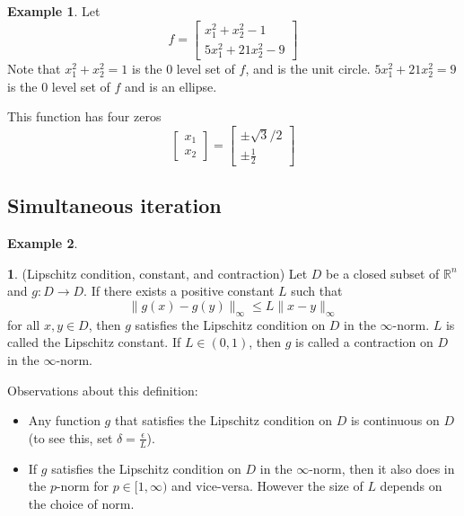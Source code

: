 \documentclass[12pt]{article}
\theoremstyle{definition}
\newtheorem{definition}{\color{NavyBlue}{\textbf{Definition}}}
\newcommand{\e}{\epsilon}
\newcommand{\R}{\mathbb{R}}
\newcommand{\norm}[1]{\lVert#1\rVert}
\newtheorem{example}{\color{WildStrawberry}Example}
\theoremstyle{definition}
\begin{document}
\begin{example}
Let 
\begin{equation}
	f = 
	\begin{bmatrix}
	x_1^2 + x_2^2 - 1 \\
	5x_1^2 + 21x_2^2 - 9
	\end{bmatrix}
\end{equation}
Note that $x_1^2 + x_2^2 = 1$ is the $0$ level set of $f$, and is the unit circle. $5x_1^2 + 21x_2^2 = 9$ is the $0$ level set of $f$ and is an ellipse. 

This function has four zeros
\begin{equation}
	\begin{bmatrix}
	x_1 \\ x_2
	\end{bmatrix}
	=
	\begin{bmatrix}
	\pm \sqrt{3}/2 \\
	\pm \frac{1}{2}
	\end{bmatrix}
\end{equation}
\end{example}

\subsection{Simultaneous iteration}

\begin{example}

\end{example}


\begin{definition}(Lipschitz condition, constant, and contraction)
Let $D$ be a closed subset of $\R^n$ and $g: D \to D$. If there exists a positive constant $L$ such that
\begin{equation}
	\norm{g(x) - g(y)}_\infty \leq L \norm{x - y}_\infty
\end{equation}
for all $x, y \in D$, then $g$ satisfies the Lipschitz condition on $D$ in the $\infty$-norm. $L$ is called the Lipschitz constant. If $L \in (0,1)$, then $g$ is called a contraction on $D$ in the $\infty$-norm. 
\end{definition}

Observations about this definition:
\begin{itemize}
	\item Any function $g$ that satisfies the Lipschitz condition on $D$ is continuous on $D$ (to see this, set $\delta = \frac{\e}{L}$). 
	\item If $g$ satisfies the Lipschitz condition on $D$ in the $\infty$-norm, then it also does in the $p$-norm for $p \in [1, \infty)$ and vice-versa. However the size of $L$ depends on the choice of norm. 
\end{itemize}
\end{document}
